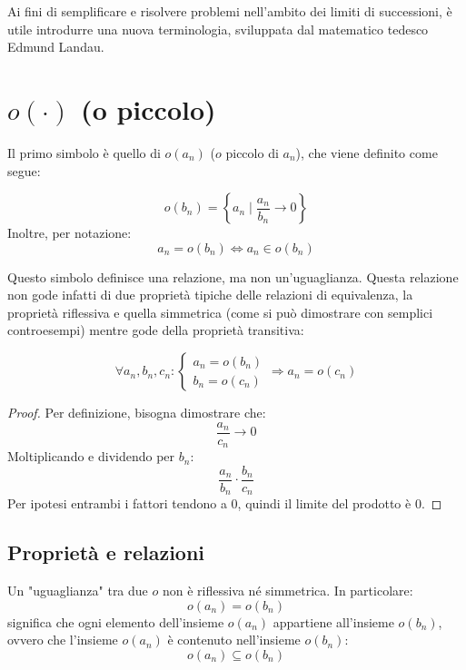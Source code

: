 Ai fini di semplificare e risolvere problemi nell'ambito dei limiti di successioni, è utile introdurre una nuova terminologia, sviluppata dal matematico tedesco Edmund Landau.

\section{\texorpdfstring{$o(\cdot)$ (o piccolo)}{o piccolo}}
Il primo simbolo è quello di $o(a_n)$ ($o$ piccolo di $a_n$), che viene definito come segue:
\begin{defin}
	\[
		o(b_n)=\left\{a_n \mid \frac{a_n}{b_n}\to0\right\}
	\]
	Inoltre, per notazione:
	\[
		a_n=o(b_n)\iff a_n\in o(b_n)
	\]
\end{defin}
Questo simbolo definisce una relazione, ma non un'uguaglianza. Questa relazione non gode infatti di due proprietà tipiche delle relazioni di equivalenza, la proprietà riflessiva e quella simmetrica (come si può dimostrare con semplici controesempi) mentre gode della proprietà transitiva:
\begin{prop}[Transitiva]
	\label{optrans}
	\[
		\forall a_n,b_n,c_n:
		\begin{cases}
			a_n=o(b_n) \\
			b_n=o(c_n)
		\end{cases}\Rightarrow a_n=o(c_n)
	\]
\end{prop}
\begin{proof}
	Per definizione, bisogna dimostrare che:
	\[
		\frac{a_n}{c_n}\to0
	\]
	Moltiplicando e dividendo per $b_n$:
	\[
		\frac{a_n}{b_n}\cdot \frac{b_n}{c_n}
	\]
	Per ipotesi entrambi i fattori tendono a $0$, quindi il limite del prodotto è $0$.
\end{proof}

\subsection{Proprietà e relazioni}
Un "uguaglianza" tra due $o$ non è riflessiva né simmetrica. In particolare:
\[
	o(a_n)=o(b_n)
\]
significa che ogni elemento dell'insieme $o(a_n)$ appartiene all'insieme $o(b_n)$, ovvero che l'insieme $o(a_n)$ è contenuto nell'insieme $o(b_n)$:
\[
	o(a_n)\subseteq o(b_n)
\]

